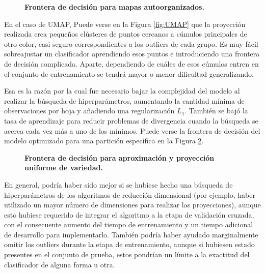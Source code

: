 \documentclass[12pt]{article}
\begin{document}
\begin{figure}[htbp]
    \centering
    
    \caption{\textbf{Frontera de decisión para mapas autoorganizados.}}
    \label{fig:BoundarySOM}
\end{figure}


En el caso de UMAP, Puede verse en la Figura \ref{fig:UMAP} que la proyección realizada crea pequeños clústeres de puntos cercanos a cúmulos principales de otro color, casi seguro correspondientes a los outliers de cada grupo. Es muy fácil sobreajustar un clasificador aprendiendo esos puntos e introduciendo una frontera de decisión complicada. Aparte, dependiendo de cuáles de esos cúmulos entren en el conjunto de entrenamiento se tendrá mayor o menor dificultad generalizando.

Esa es la razón por la cual fue necesario bajar la complejidad del modelo al realizar la búsqueda de hiperparámetros, aumentando la cantidad mínima de observaciones por hoja y añadiendo una regularización $L_1$. También se bajó la tasa de aprendizaje para reducir problemas de divergencia cuando la búsqueda se acerca cada vez más a uno de los mínimos. Puede verse la frontera de decisión del modelo optimizado para una partición específica en la Figura \ref{fig:BoundaryUMAP}.

\begin{figure}[htbp]
    \centering
    
    \caption{\textbf{Frontera de decisión para aproximación y proyección uniforme de variedad.}}
    \label{fig:BoundaryUMAP}
\end{figure}

En general, podría haber sido mejor si se hubiese hecho una búsqueda de hiperparámetros de los algoritmos de reducción dimensional (por ejemplo, haber utilizado un mayor número de dimensiones para realizar las proyecciones), aunque esto hubiese requerido de integrar el algoritmo a la etapa de validación cruzada, con el consecuente aumento del tiempo de entrenamiento y un tiempo adicional de desarrollo para implementarlo. También podría haber ayudado marginalmente omitir los outliers durante la etapa de entrenamiento, aunque si hubiesen estado presentes en el conjunto de prueba, estos pondrían un límite a la exactitud del clasificador de alguna forma u otra. 
\end{document}
